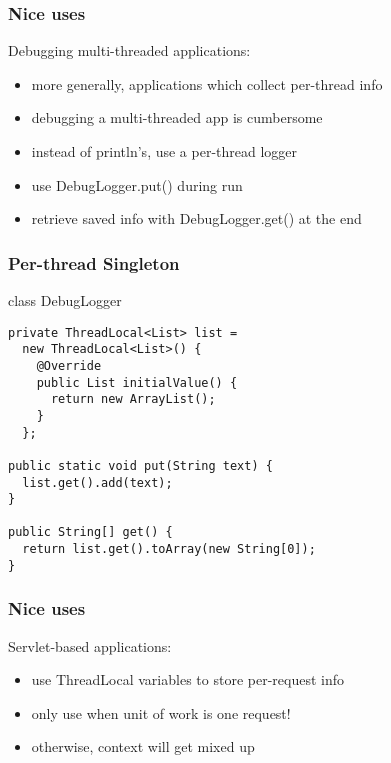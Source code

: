 \documentclass{beamer}
\begin{document}
\begin{frame}
  \frametitle{Nice uses}

Debugging multi-threaded applications:
\begin{itemize}
\item more generally, applications which collect per-thread info
\item debugging a multi-threaded app is cumbersome
\item instead of println's, use a per-thread logger
\item use DebugLogger.put() during run
\item retrieve saved info with DebugLogger.get() at the end
\end{itemize}

\end{frame}

\begin{frame}[fragile]
  \frametitle{Per-thread Singleton}

\begin{block}{class DebugLogger}
\begin{verbatim}
private ThreadLocal<List> list =
  new ThreadLocal<List>() {
    @Override
    public List initialValue() {
      return new ArrayList();
    }
  };

public static void put(String text) {
  list.get().add(text);
}

public String[] get() {
  return list.get().toArray(new String[0]);
}
\end{verbatim}
\end{block}

\end{frame}

\begin{frame}
  \frametitle{Nice uses}

Servlet-based applications:
\begin{itemize}
\item use ThreadLocal variables to store per-request info
\item only use when unit of work is one request!
\item otherwise, context will get mixed up
\end{itemize}

\end{frame}
\end{document}
